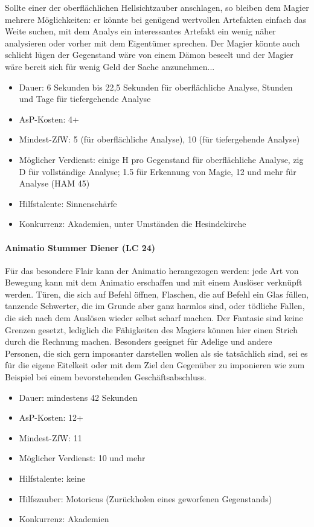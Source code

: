 Sollte einer der oberflächlichen Hellsichtzauber anschlagen, so bleiben dem Magier mehrere Möglichkeiten: er könnte bei genügend wertvollen Artefakten einfach das Weite suchen, mit dem Analys ein interessantes Artefakt ein wenig näher analysieren oder vorher mit dem Eigentümer sprechen. Der Magier könnte auch schlicht lügen der Gegenstand wäre von einem Dämon beseelt und der Magier wäre bereit sich für wenig Geld der Sache anzunehmen...
\begin{itemize}
	\item Dauer: 6 Sekunden bis 22,5 Sekunden für oberflächliche Analyse, Stunden und Tage für tiefergehende Analyse
	\item AsP-Kosten: 4+
	\item Mindest-ZfW: 5 (für oberflächliche Analyse), 10 (für tiefergehende Analyse)
	\item Möglicher Verdienst: einige H pro Gegenstand für oberflächliche Analyse, zig D für vollständige Analyse; \SI{1,5}{\D} für Erkennung von Magie, \SI{12}{\D} und mehr für Analyse (HAM 45)
	\item Hilfstalente: Sinnenschärfe
	\item Konkurrenz: Akademien, unter Umständen die Hesindekirche
\end{itemize}

\paragraph{Animatio Stummer Diener (LC 24)}
Für das besondere Flair kann der Animatio herangezogen werden: jede Art von Bewegung kann mit dem Animatio erschaffen und mit einem Auslöser verknüpft werden. Türen, die sich auf Befehl öffnen, Flaschen, die auf Befehl ein Glas füllen, tanzende Schwerter, die im Grunde aber ganz harmlos sind, oder tödliche Fallen, die sich nach dem Auslösen wieder selbst scharf machen. Der Fantasie sind keine Grenzen gesetzt, lediglich die Fähigkeiten des Magiers können hier einen Strich durch die Rechnung machen. Besonders geeignet für Adelige und andere Personen, die sich gern imposanter darstellen wollen als sie tatsächlich sind, sei es für die eigene Eitelkeit oder mit dem Ziel den Gegenüber zu imponieren wie zum Beispiel bei einem bevorstehenden Geschäftsabschluss.
\begin{itemize}
	\item Dauer: mindestens 42 Sekunden
	\item AsP-Kosten: 12+
	\item Mindest-ZfW: 11
	\item Möglicher Verdienst: \SI{10}{\D} und mehr
	\item Hilfstalente: keine
	\item Hilfszauber: Motoricus (Zurückholen eines geworfenen Gegenstands)
	\item Konkurrenz: Akademien
\end{itemize}

